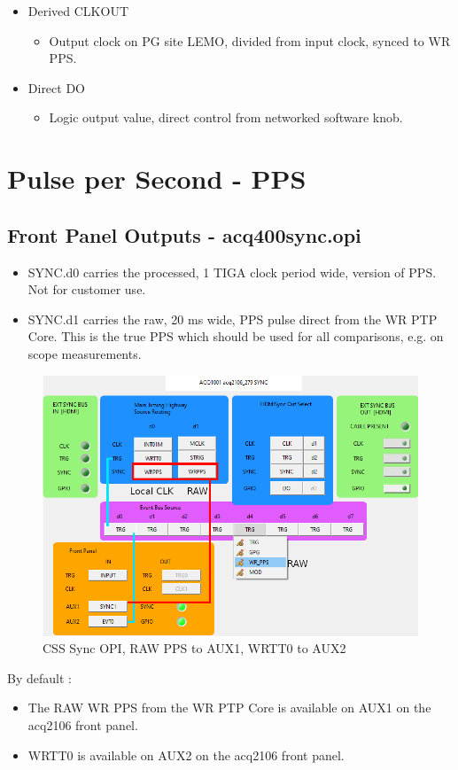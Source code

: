 \documentclass[]{article}
\begin{document}
\begin{itemize}
\begin{itemize}
	\end{itemize}
	\item Derived CLKOUT
	\begin{itemize}
		\item Output clock on PG site LEMO, divided from input clock, synced to WR PPS.
	\end{itemize}
	\item Direct DO
	\begin{itemize}
		\item Logic output value, direct control from networked software knob.
	\end{itemize}
\end{itemize}
 
\section{Pulse per Second - PPS}
\subsection{Front Panel Outputs - acq400sync.opi}
\begin{itemize}
	\item SYNC.d0 carries the processed, 1 TIGA clock period wide, version of PPS. Not for customer use.
	\item SYNC.d1 carries the raw, 20 ms wide,  PPS pulse direct from the WR PTP Core. This is the true PPS which should be used for all comparisons, e.g. on scope measurements.
\end{itemize}

\begin{figure}[H]
	\centering
	\includegraphics[height=0.5\textwidth]{images/evt_wr_pps_mod}
	\caption{CSS Sync OPI, RAW PPS to AUX1, WRTT0 to AUX2}
	\label{fig:syncopi}
\end{figure}

By default :
\begin{itemize}
	\item The RAW WR PPS from the WR PTP Core is available on AUX1 on the acq2106 front panel.
	\item WRTT0 is available on AUX2 on the acq2106 front panel.
\end{itemize}
\end{document}
